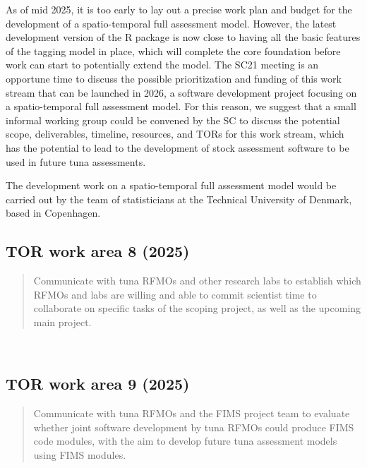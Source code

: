 \documentclass{SCreport}
\begin{document}
As of mid 2025, it is too early to lay out a precise work plan and budget for
the development of a spatio-temporal full assessment model. However, the latest
development version of the R package is now close to having all the basic
features of the tagging model in place, which will complete the core foundation
before work can start to potentially extend the model. The SC21 meeting is an
opportune time to discuss the possible prioritization and funding of this work
stream that can be launched in 2026, a software development project focusing on
a spatio-temporal full assessment model. For this reason, we suggest that a
small informal working group could be convened by the SC to discuss the
potential scope, deliverables, timeline, resources, and TORs for this work
stream, which has the potential to lead to the development of stock assessment
software to be used in future tuna assessments.

The development work on a spatio-temporal full assessment model would be carried
out by the team of statisticians at the Technical University of Denmark, based
in Copenhagen.

\vspace{2ex}

\subsection{TOR work area 8 (2025)}

\begin{quote}\sf
  Communicate with tuna RFMOs and other research labs to establish which RFMOs
  and labs are willing and able to commit scientist time to collaborate on
  specific tasks of the scoping project, as well as the upcoming main project.
\end{quote}

\vspace{2ex}

~

\vspace{2ex}

\subsection{TOR work area 9 (2025)}

\begin{quote}\sf
  Communicate with tuna RFMOs and the FIMS project team to evaluate whether
  joint software development by tuna RFMOs could produce FIMS code modules, with
  the aim to develop future tuna assessment models using FIMS modules.
\end{quote}
\end{document}
